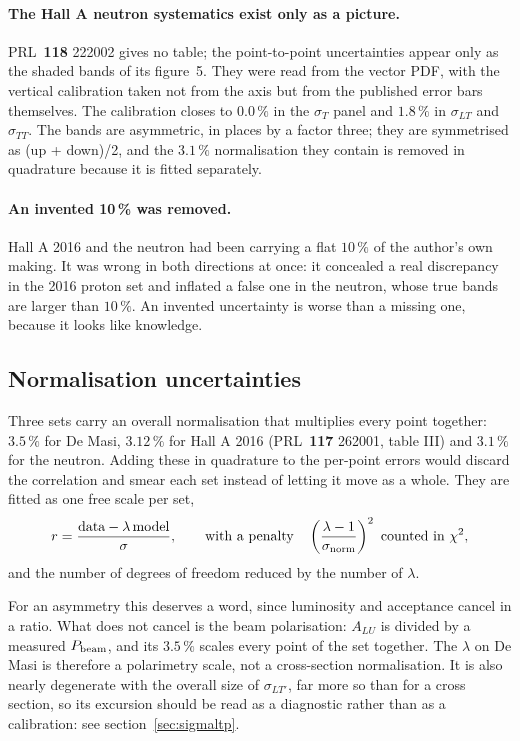 \documentclass[11pt,a4paper]{article}
\newcommand{\sig}[1]{\sigma_{#1}}
\begin{document}
\paragraph{The Hall A neutron systematics exist only as a picture.}
PRL~\textbf{118} 222002 gives no table; the point-to-point uncertainties appear
only as the shaded bands of its figure~5.  They were read from the vector PDF,
with the vertical calibration taken not from the axis but from the published
error bars themselves.  The calibration closes to $0.0\,\%$ in the $\sig{T}$
panel and $1.8\,\%$ in $\sig{LT}$ and $\sig{TT}$.  The bands are asymmetric, in
places by a factor three; they are symmetrised as (up + down)/2, and the
$3.1\,\%$ normalisation they contain is removed in quadrature because it is
fitted separately.

\paragraph{An invented 10\,\% was removed.}  Hall A 2016 and the neutron had
been carrying a flat $10\,\%$ of the author's own making.  It was wrong in both
directions at once: it concealed a real discrepancy in the 2016 proton set and
inflated a false one in the neutron, whose true bands are larger than $10\,\%$.
An invented uncertainty is worse than a missing one, because it looks like
knowledge.

\subsection{Normalisation uncertainties}

Three sets carry an overall normalisation that multiplies every point together:
$3.5\,\%$ for De Masi, $3.12\,\%$ for Hall A 2016 (PRL~\textbf{117} 262001,
table III) and $3.1\,\%$ for the neutron.  Adding these in quadrature to the
per-point errors would discard the correlation and smear each set instead of
letting it move as a whole.  They are fitted as one free scale per set,
\begin{equation}
r = \frac{\text{data} - \lambda\,\text{model}}{\sigma},
\qquad\text{with a penalty}\quad \left(\frac{\lambda-1}{\sigma_{\rm norm}}\right)^2
\ \text{counted in }\chi^2,
\end{equation}
and the number of degrees of freedom reduced by the number of $\lambda$.

For an asymmetry this deserves a word, since luminosity and acceptance cancel
in a ratio.  What does not cancel is the beam polarisation: $A_{LU}$ is divided
by a measured $P_{\rm beam}$, and its $3.5\,\%$ scales every point of the set
together.  The $\lambda$ on De Masi is therefore a polarimetry scale, not a
cross-section normalisation.  It is also nearly degenerate with the overall
size of $\sig{LT'}$, far more so than for a cross section, so its excursion
should be read as a diagnostic rather than as a calibration: see
section~\ref{sec:sigmaltp}.
\end{document}
